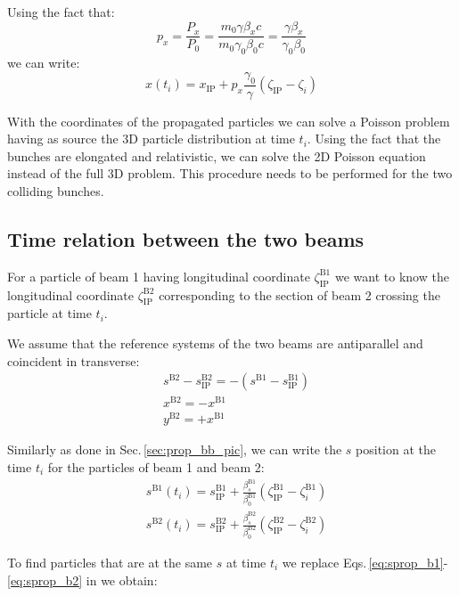 Using the fact that:
\begin{equation}
p_x=\frac{P_x}{P_0}=\frac{m_0 \gamma \beta_x c}{m_0 \gamma_0 \beta_0 c} =\frac{ \gamma \beta_x}{ \gamma_0 \beta_0} 
\end{equation}
we can write:
\begin{equation}
x \left( t_i \right)
= x_\text{IP} + p_x\frac{\gamma_0}{\gamma}\left(\zeta_\text{IP} -  \zeta_i \right)
\end{equation}

With the coordinates of the propagated particles we can solve a Poisson problem having as source the 3D particle distribution at time $t_i$. Using the fact that the bunches are elongated and relativistic, we can solve the 2D Poisson equation instead of the full 3D problem. This procedure needs to be performed for the two colliding bunches.

\subsection{Time relation between the two beams}
For a particle of beam 1 having longitudinal coordinate $\zeta_\text{IP}^\text{B1}$ we want to know the longitudinal coordinate $\zeta_\text{IP}^\text{B2}$ corresponding to the section of beam 2 crossing the particle at time $t_i$.

We assume that the reference systems of the two beams are antiparallel and coincident in transverse:
\begin{align}
&s^\text{B2} - s_\text{IP}^\text{B2} = 
- \left( s^\text{B1} - s_\text{IP}^\text{B1}\right)
\label{eq:sb1b2}\\
&x^\text{B2} = - x^\text{B1}\\
&y^\text{B2} = + x^\text{B1}
\end{align}

Similarly as done in Sec.\,\ref{sec:prop_bb_pic}, we can write the $s$ position at the time $t_i$ for the particles of beam 1 and beam 2:
\begin{align}
&s^\text{B1} \left( t_i \right)
= s^\text{B1}_\text{IP} + \frac{\beta^\text{B1}_s}{\beta_0^\text{B1}}\left(\zeta^\text{B1}_\text{IP} -  \zeta^\text{B1}_i \right)
\label{eq:sprop_b1}\\
&s^\text{B2} \left( t_i \right)
= s^\text{B2}_\text{IP} + \frac{\beta^\text{B2}_s}{\beta_0^\text{B2}}\left(\zeta^\text{B2}_\text{IP} -  \zeta^\text{B2}_i \right)
\label{eq:sprop_b2}
\end{align}

To find particles that are at the same $s$ at time $t_i$ we replace Eqs.\,\ref{eq:sprop_b1}-\ref{eq:sprop_b2} in \label{eq:sb1b2} we obtain:

